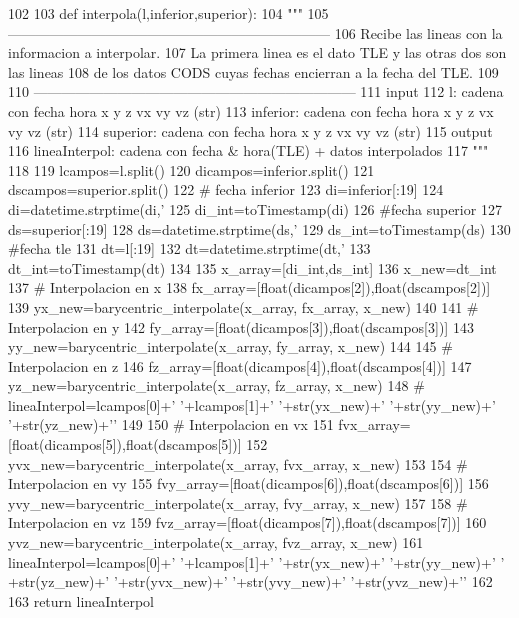 \begin{DoxyCode}
102 
103 def interpola(l,inferior,superior):
104     """
105     ---------------------------------------------------------------------
106     Recibe las lineas con la informacion a interpolar.
107     La primera linea es el dato TLE y las otras dos son las lineas
108     de los datos CODS cuyas fechas encierran a la fecha del TLE.
109 
110     ---------------------------------------------------------------------
111     input
112         l: cadena con fecha hora x y z vx vy vz (str)
113         inferior: cadena con fecha hora x y z vx vy vz (str)
114         superior: cadena con fecha hora x y z vx vy vz (str)
115     output
116         lineaInterpol: cadena con fecha & hora(TLE) + datos interpolados 
117     """
118 
119     lcampos=l.split()
120     dicampos=inferior.split()
121     dscampos=superior.split()
122     # fecha inferior
123     di=inferior[:19]
124     di=datetime.strptime(di,'%
125     di_int=toTimestamp(di)
126     #fecha superior
127     ds=superior[:19]
128     ds=datetime.strptime(ds,'%
129     ds_int=toTimestamp(ds)
130     #fecha tle
131     dt=l[:19]
132     dt=datetime.strptime(dt,'%
133     dt_int=toTimestamp(dt)
134     
135     x_array=[di_int,ds_int]
136     x_new=dt_int
137     # Interpolacion en x
138     fx_array=[float(dicampos[2]),float(dscampos[2])]
139     yx_new=barycentric_interpolate(x_array, fx_array, x_new)
140 
141     # Interpolacion en y
142     fy_array=[float(dicampos[3]),float(dscampos[3])]
143     yy_new=barycentric_interpolate(x_array, fy_array, x_new)
144     
145     # Interpolacion en z
146     fz_array=[float(dicampos[4]),float(dscampos[4])]
147     yz_new=barycentric_interpolate(x_array, fz_array, x_new)
148 #    lineaInterpol=lcampos[0]+' '+lcampos[1]+' '+str(yx_new)+' '+str(yy_new)+'
       '+str(yz_new)+'\n'
149     
150     # Interpolacion en vx
151     fvx_array=[float(dicampos[5]),float(dscampos[5])]
152     yvx_new=barycentric_interpolate(x_array, fvx_array, x_new)
153  
154     # Interpolacion en vy
155     fvy_array=[float(dicampos[6]),float(dscampos[6])]
156     yvy_new=barycentric_interpolate(x_array, fvy_array, x_new)
157      
158     # Interpolacion en vz
159     fvz_array=[float(dicampos[7]),float(dscampos[7])]
160     yvz_new=barycentric_interpolate(x_array, fvz_array, x_new)
161     lineaInterpol=lcampos[0]+' '+lcampos[1]+' '+str(yx_new)+' '+str(yy_new)+' '
      +str(yz_new)+' '+str(yvx_new)+' '+str(yvy_new)+' '+str(yvz_new)+'\n'
162     
163     return lineaInterpol

\end{DoxyCode}


